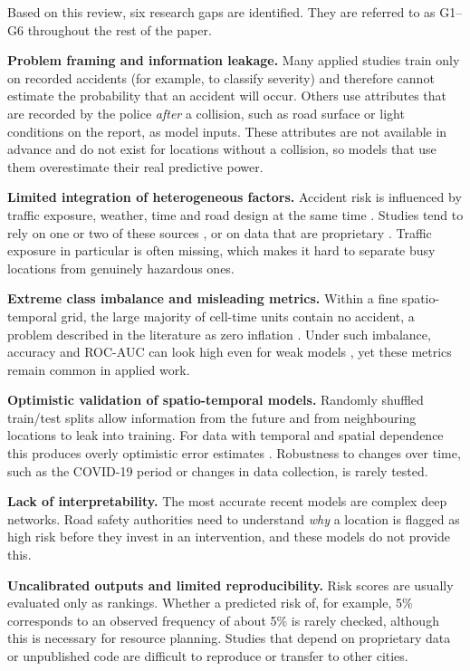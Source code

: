Based on this review, six research gaps are identified. They are referred to as G1--G6 throughout the rest of the paper.

\begin{description}[leftmargin=0.9cm, style=nextline]
\item[G1] \textbf{Problem framing and information leakage.} Many applied studies train only on recorded accidents (for example, to classify severity) and therefore cannot estimate the probability that an accident will occur. Others use attributes that are recorded by the police \emph{after} a collision, such as road surface or light conditions on the report, as model inputs. These attributes are not available in advance and do not exist for locations without a collision, so models that use them overestimate their real predictive power.

\item[G2] \textbf{Limited integration of heterogeneous factors.} Accident risk is influenced by traffic exposure, weather, time and road design at the same time \cite{theofilatos2014review,lord2010statistical}. Studies tend to rely on one or two of these sources \cite{ren2018deep}, or on data that are proprietary \cite{chen2016learning,zhou2020riskoracle}. Traffic exposure in particular is often missing, which makes it hard to separate busy locations from genuinely hazardous ones.

\item[G3] \textbf{Extreme class imbalance and misleading metrics.} Within a fine spatio-temporal grid, the large majority of cell-time units contain no accident, a problem described in the literature as zero inflation \cite{zhou2020riskoracle,wang2021gsnet}. Under such imbalance, accuracy and ROC-AUC can look high even for weak models \cite{saito2015precision,he2009learning}, yet these metrics remain common in applied work.

\item[G4] \textbf{Optimistic validation of spatio-temporal models.} Randomly shuffled train/test splits allow information from the future and from neighbouring locations to leak into training. For data with temporal and spatial dependence this produces overly optimistic error estimates \cite{roberts2017cross,cerqueira2020evaluating}. Robustness to changes over time, such as the COVID-19 period or changes in data collection, is rarely tested.

\item[G5] \textbf{Lack of interpretability.} The most accurate recent models \cite{yuan2018hetero,zhou2020riskoracle,wang2021gsnet} are complex deep networks. Road safety authorities need to understand \emph{why} a location is flagged as high risk before they invest in an intervention, and these models do not provide this.

\item[G6] \textbf{Uncalibrated outputs and limited reproducibility.} Risk scores are usually evaluated only as rankings. Whether a predicted risk of, for example, 5\% corresponds to an observed frequency of about 5\% is rarely checked, although this is necessary for resource planning. Studies that depend on proprietary data or unpublished code are difficult to reproduce or transfer to other cities.
\end{description}
